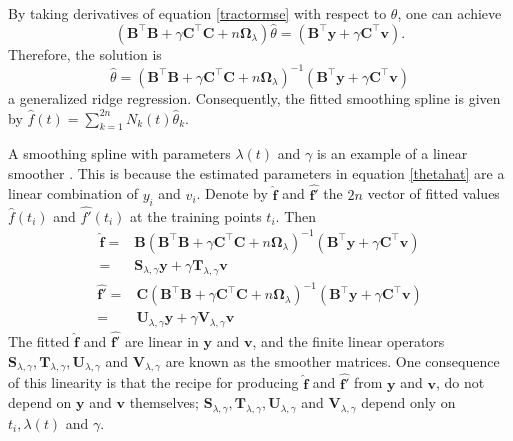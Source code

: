By taking derivatives of equation \eqref{tractormse} with respect to $\theta$, one can achieve 
\begin{equation}
\left(\mathbf{B}^\top\mathbf{B}+\gamma\mathbf{C}^\top\mathbf{C}+n\mathbf{\Omega}_{\lambda}\right)\hat{\theta}=\left(\mathbf{B}^\top\mathbf{y}+\gamma\mathbf{C}^\top\mathbf{v}\right).
\end{equation}
Therefore, the solution is 
\begin{equation}
\hat{\theta}=\left(\mathbf{B}^\top\mathbf{B}+\gamma\mathbf{C}^\top\mathbf{C}+n\mathbf{\Omega}_{\lambda}\right)^{-1}\left(\mathbf{B}^\top\mathbf{y}+\gamma\mathbf{C}^\top\mathbf{v}\right)\label{thetahat}
\end{equation}
a generalized ridge regression. Consequently, the fitted smoothing spline is given by
$\hat{f}(t)=\sum_{k=1}^{2n}N_k(t)\hat{\theta}_k$. 

A smoothing spline with parameters $\lambda(t)$ and $\gamma$ is an example of a linear smoother \citep{esl2009}. This is because the estimated parameters in equation \eqref{thetahat} are a linear combination of $y_i$ and $v_i$. Denote by $\hat{\mathbf{f}}$ and $\hat{\mathbf{f}'}$ the $2n$ vector of fitted values $\hat{f}(t_i)$ and $\hat{f'}(t_i)$ at the training points $t_i$. Then
\begin{equation}
\begin{split}
\hat{\mathbf{f}} =&\mathbf{B}\left(\mathbf{B}^\top\mathbf{B}+\gamma\mathbf{C}^\top\mathbf{C}+n\mathbf{\Omega}_{\lambda}\right)^{-1}\left(\mathbf{B}^\top\mathbf{y}+\gamma\mathbf{C}^\top\mathbf{v}\right)\\
= & \mathbf{S}_{\lambda,\gamma}\mathbf{y}+\gamma\mathbf{T}_{\lambda,\gamma}\mathbf{v} 
\end{split}
\end{equation}
\begin{equation}
\begin{split}
\hat{\mathbf{f}'}
=&\mathbf{C}\left(\mathbf{B}^\top\mathbf{B}+\gamma\mathbf{C}^\top\mathbf{C}+n\mathbf{\Omega}_{\lambda}\right)^{-1}\left(\mathbf{B}^\top\mathbf{y}+\gamma\mathbf{C}^\top\mathbf{v}\right)\\
=&\mathbf{U}_{\lambda,\gamma}\mathbf{y}+\gamma\mathbf{V}_{\lambda,\gamma}\mathbf{v}
\end{split}
\end{equation}
The fitted $\hat{\mathbf{f}}$ and $\hat{\mathbf{f}'}$ are linear in $\mathbf{y}$ and $\mathbf{v}$, and the finite linear operators $\mathbf{S}_{\lambda,\gamma}, \mathbf{T}_{\lambda,\gamma}, \mathbf{U}_{\lambda,\gamma}$ and $\mathbf{V}_{\lambda,\gamma}$ are known as the smoother matrices. One consequence of this linearity is that the recipe for producing $\hat{\mathbf{f}}$ and $\hat{\mathbf{f}'}$ from $\mathbf{y}$ and $\mathbf{v}$, do not depend on $\mathbf{y}$ and $\mathbf{v}$ themselves; $\mathbf{S}_{\lambda,\gamma}, \mathbf{T}_{\lambda,\gamma}, \mathbf{U}_{\lambda,\gamma}$ and $\mathbf{V}_{\lambda,\gamma}$ depend only on $t_i,\lambda(t)$ and $\gamma$.

